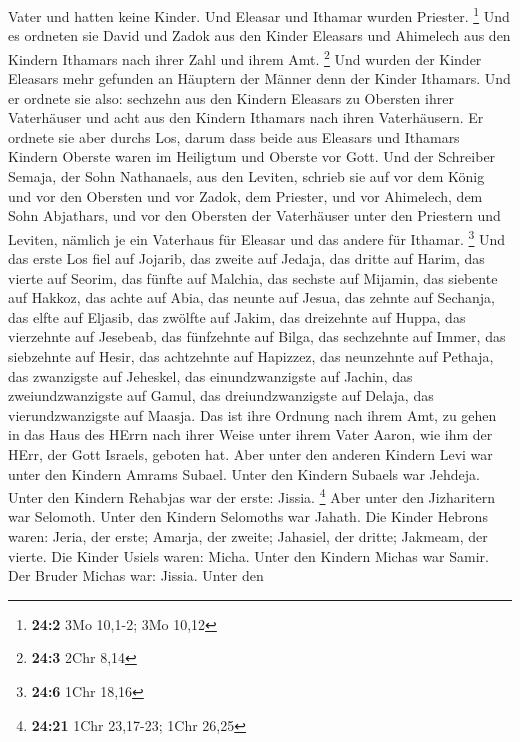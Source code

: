 Vater und hatten keine Kinder. Und Eleasar und Ithamar wurden Priester.
\footnote{\textbf{24:2} 3Mo 10,1-2; 3Mo 10,12}  Und es
ordneten sie David und Zadok aus den Kinder Eleasars und Ahimelech aus
den Kindern Ithamars nach ihrer Zahl und ihrem Amt. \footnote{\textbf{24:3}
  2Chr 8,14}  Und wurden der Kinder Eleasars mehr gefunden
an Häuptern der Männer denn der Kinder Ithamars. Und er ordnete sie
also: sechzehn aus den Kindern Eleasars zu Obersten ihrer Vaterhäuser
und acht aus den Kindern Ithamars nach ihren Vaterhäusern. 
Er ordnete sie aber durchs Los, darum dass beide aus Eleasars und
Ithamars Kindern Oberste waren im Heiligtum und Oberste vor Gott.
 Und der Schreiber Semaja, der Sohn Nathanaels, aus den
Leviten, schrieb sie auf vor dem König und vor den Obersten und vor
Zadok, dem Priester, und vor Ahimelech, dem Sohn Abjathars, und vor den
Obersten der Vaterhäuser unter den Priestern und Leviten, nämlich je ein
Vaterhaus für Eleasar und das andere für Ithamar. \footnote{\textbf{24:6}
  1Chr 18,16}  Und das erste Los fiel auf Jojarib, das
zweite auf Jedaja,  das dritte auf Harim, das vierte auf
Seorim,  das fünfte auf Malchia, das sechste auf Mijamin,
 das siebente auf Hakkoz, das achte auf Abia, 
das neunte auf Jesua, das zehnte auf Sechanja,  das elfte
auf Eljasib, das zwölfte auf Jakim,  das dreizehnte auf
Huppa, das vierzehnte auf Jesebeab,  das fünfzehnte auf
Bilga, das sechzehnte auf Immer,  das siebzehnte auf Hesir,
das achtzehnte auf Hapizzez,  das neunzehnte auf Pethaja,
das zwanzigste auf Jeheskel,  das einundzwanzigste auf
Jachin, das zweiundzwanzigste auf Gamul,  das
dreiundzwanzigste auf Delaja, das vierundzwanzigste auf Maasja.
 Das ist ihre Ordnung nach ihrem Amt, zu gehen in das Haus
des HErrn nach ihrer Weise unter ihrem Vater Aaron, wie ihm der HErr,
der Gott Israels, geboten hat.  Aber unter den anderen
Kindern Levi war unter den Kindern Amrams Subael. Unter den Kindern
Subaels war Jehdeja.  Unter den Kindern Rehabjas war der
erste: Jissia. \footnote{\textbf{24:21} 1Chr 23,17-23; 1Chr 26,25}
 Aber unter den Jizharitern war Selomoth. Unter den Kindern
Selomoths war Jahath.  Die Kinder Hebrons waren: Jeria, der
erste; Amarja, der zweite; Jahasiel, der dritte; Jakmeam, der vierte.
 Die Kinder Usiels waren: Micha. Unter den Kindern Michas
war Samir.  Der Bruder Michas war: Jissia. Unter den
